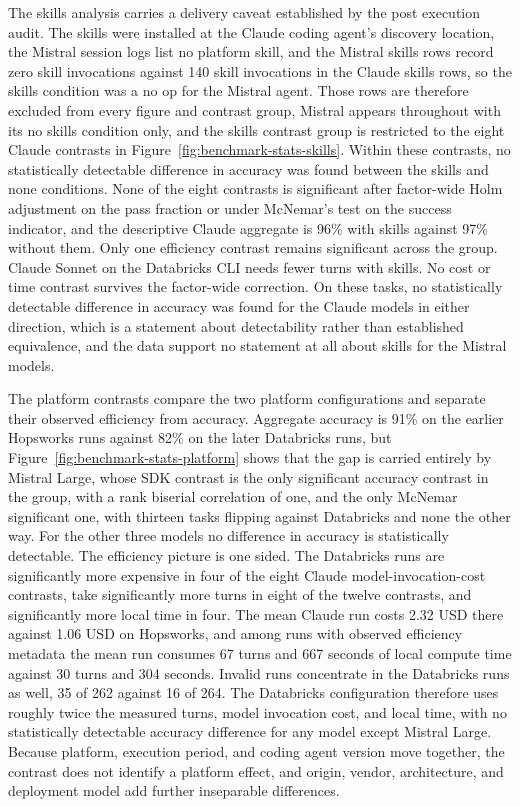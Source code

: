 \documentclass[
english,                 %
bibtex,                  %
]{kththesis}
\numberwithin{listing}{chapter}
\begin{document}
The skills analysis carries a delivery caveat established by the post execution audit. The skills were installed at the Claude coding agent's discovery location, the Mistral session logs list no platform skill, and the Mistral skills rows record zero skill invocations against 140 skill invocations in the Claude skills rows, so the skills condition was a no op for the Mistral agent. Those rows are therefore excluded from every figure and contrast group, Mistral appears throughout with its no skills condition only, and the skills contrast group is restricted to the eight Claude contrasts in Figure~\ref{fig:benchmark-stats-skills}. Within these contrasts, no statistically detectable difference in accuracy was found between the skills and none conditions. None of the eight contrasts is significant after factor-wide Holm adjustment on the pass fraction or under McNemar's test on the success indicator, and the descriptive Claude aggregate is 96\% with skills against 97\% without them. Only one efficiency contrast remains significant across the group. Claude Sonnet on the Databricks \gls{CLI} needs fewer turns with skills. No cost or time contrast survives the factor-wide correction. On these tasks, no statistically detectable difference in accuracy was found for the Claude models in either direction, which is a statement about detectability rather than established equivalence, and the data support no statement at all about skills for the Mistral models.

The platform contrasts compare the two platform configurations and separate their observed efficiency from accuracy. Aggregate accuracy is 91\% on the earlier Hopsworks runs against 82\% on the later Databricks runs, but Figure~\ref{fig:benchmark-stats-platform} shows that the gap is carried entirely by Mistral Large, whose \gls{SDK} contrast is the only significant accuracy contrast in the group, with a rank biserial correlation of one, and the only McNemar significant one, with thirteen tasks flipping against Databricks and none the other way. For the other three models no difference in accuracy is statistically detectable. The efficiency picture is one sided. The Databricks runs are significantly more expensive in four of the eight Claude model-invocation-cost contrasts, take significantly more turns in eight of the twelve contrasts, and significantly more local time in four. The mean Claude run costs 2.32 \gls{USD} there against 1.06 \gls{USD} on Hopsworks, and among runs with observed efficiency metadata the mean run consumes 67 turns and 667 seconds of local compute time against 30 turns and 304 seconds. Invalid runs concentrate in the Databricks runs as well, 35 of 262 against 16 of 264. The Databricks configuration therefore uses roughly twice the measured turns, model invocation cost, and local time, with no statistically detectable accuracy difference for any model except Mistral Large. Because platform, execution period, and coding agent version move together, the contrast does not identify a platform effect, and origin, vendor, architecture, and deployment model add further inseparable differences.
\end{document}
